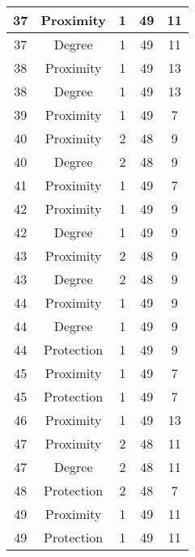 \documentclass[results.tex]{subfiles}
\begin{document}
\begin{center}
\begin{tabular}{| c || c | c | c | c |}
    \hline
    37 & Proximity & 1 & 49 & 11 \\ 
    \hline
    37 & Degree & 1 & 49 & 11 \\ 
    \hline
    38 & Proximity & 1 & 49 & 13 \\ 
    \hline
    38 & Degree & 1 & 49 & 13 \\ 
    \hline
    39 & Proximity & 1 & 49 & 7 \\ 
    \hline
    40 & Proximity & 2 & 48 & 9 \\ 
    \hline
    40 & Degree & 2 & 48 & 9 \\ 
    \hline
    41 & Proximity & 1 & 49 & 7 \\ 
    \hline
    42 & Proximity & 1 & 49 & 9 \\ 
    \hline
    42 & Degree & 1 & 49 & 9 \\ 
    \hline
    43 & Proximity & 2 & 48 & 9 \\ 
    \hline
    43 & Degree & 2 & 48 & 9 \\ 
    \hline
    44 & Proximity & 1 & 49 & 9 \\ 
    \hline
    44 & Degree & 1 & 49 & 9 \\ 
    \hline
    44 & Protection & 1 & 49 & 9 \\ 
    \hline
    45 & Proximity & 1 & 49 & 7 \\ 
    \hline
    45 & Protection & 1 & 49 & 7 \\ 
    \hline
    46 & Proximity & 1 & 49 & 13 \\ 
    \hline
    47 & Proximity & 2 & 48 & 11 \\ 
    \hline
    47 & Degree & 2 & 48 & 11 \\ 
    \hline
    48 & Protection & 2 & 48 & 7 \\ 
    \hline
    49 & Proximity & 1 & 49 & 11 \\ 
    \hline
    49 & Protection & 1 & 49 & 11 \\ 
    \hline   \end{tabular}
\end{center}
\end{document}
